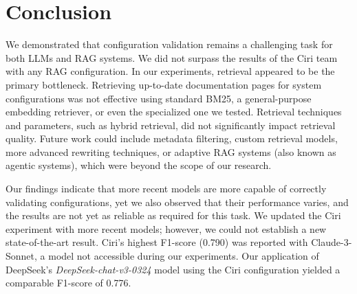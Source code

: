\section{Conclusion} \label{sec:exp_conclusion}

We demonstrated that configuration validation remains a challenging task for both LLMs and RAG systems. We did not surpass the results of the Ciri team with any RAG configuration. In our experiments, retrieval appeared to be the primary bottleneck. Retrieving up-to-date documentation pages for system configurations was not effective using standard BM25, a general-purpose embedding retriever, or even the specialized one we tested. Retrieval techniques and parameters, such as hybrid retrieval, did not significantly impact retrieval quality. Future work could include metadata filtering, custom retrieval models, more advanced rewriting techniques, or adaptive RAG systems (also known as agentic systems), which were beyond the scope of our research.

Our findings indicate that more recent models are more capable of correctly validating configurations, yet we also observed that their performance varies, and the results are not yet as reliable as required for this task. We updated the Ciri experiment with more recent models; however, we could not establish a new state-of-the-art result. Ciri's highest F1-score (0.790) was reported with Claude-3-Sonnet, a model not accessible during our experiments. Our application of DeepSeek's \textit{DeepSeek-chat-v3-0324} model using the Ciri configuration yielded a comparable F1-score of 0.776.